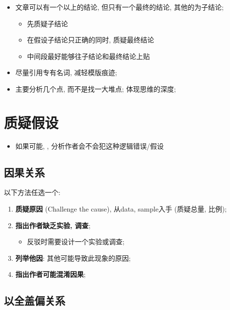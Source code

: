   \begin{itemize}
    \item 文章可以有一个以上的结论, 但只有一个最终的结论, 其他的为子结论;
    \begin{itemize}
      \item 先质疑子结论
      \item 在假设子结论只正确的同时, 质疑最终结论
      \item 中间段最好能够往子结论和最终结论上贴
    \end{itemize}

    \item 尽量引用专有名词, 减轻模版痕迹;
    \item 主要分析几个点, 而不是找一大堆点; 体现思维的深度;
  \end{itemize}

\section{质疑假设}

  \begin{itemize}
    \item 如果可能, , 分析作者会不会犯这种逻辑错误/假设
  \end{itemize}

  \subsection{因果关系}

    以下方法任选一个:

    \begin{enumerate}
      \item \textbf{质疑原因} (Challenge the cause), 从data, sample入手
      (质疑总量, 比例);
      \item \textbf{指出作者缺乏实验, 调查};
      \begin{itemize}
        \item 反驳时需要设计一个实验或调查;
      \end{itemize}

      \item \textbf{列举他因}: 其他可能导致此现象的原因;
      \item \textbf{指出作者可能混淆因果};
    \end{enumerate}

  \subsection{以全盖偏关系}

